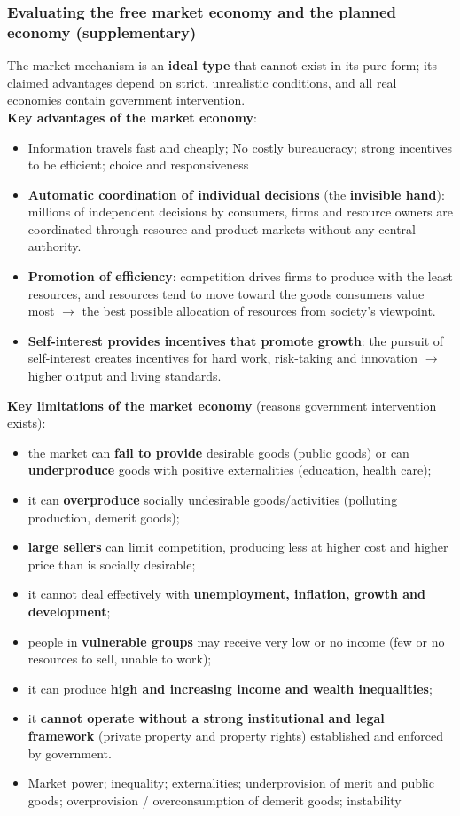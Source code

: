 \documentclass[a4paper,12pt]{article}
\newcommand{\needbold}[1]{\textcolor{red!70!black}{\textbf{#1}}}
\begin{document}
\subsubsection*{Evaluating the free market economy and the planned economy (supplementary)}
The market mechanism is an \needbold{ideal type} that cannot exist in its pure form; its claimed advantages depend on strict, unrealistic conditions, and all real economies contain government intervention.
\\
\textbf{Key advantages of the market economy}:
\begin{itemize}
	\item Information travels fast and cheaply; No costly bureaucracy; strong incentives to be efficient; choice and responsiveness
  \item \textbf{Automatic coordination of individual decisions} (the \textbf{invisible hand}): millions of independent decisions by consumers, firms and resource owners are coordinated through resource and product markets without any central authority.
  \item \textbf{Promotion of efficiency}: competition drives firms to produce with the least resources, and resources tend to move toward the goods consumers value most $\to$ the best possible allocation of resources from society's viewpoint.
  \item \textbf{Self-interest provides incentives that promote growth}: the pursuit of self-interest creates incentives for hard work, risk-taking and innovation $\to$ higher output and living standards.
\end{itemize}
\textbf{Key limitations of the market economy} (reasons government intervention exists):
\begin{itemize}
  \item the market can \textbf{fail to provide} desirable goods (public goods) or can \textbf{underproduce} goods with positive externalities (education, health care);
  \item it can \textbf{overproduce} socially undesirable goods/activities (polluting production, demerit goods);
  \item \textbf{large sellers} can limit competition, producing less at higher cost and higher price than is socially desirable;
  \item it cannot deal effectively with \textbf{unemployment, inflation, growth and development};
  \item people in \textbf{vulnerable groups} may receive very low or no income (few or no resources to sell, unable to work);
  \item it can produce \textbf{high and increasing income and wealth inequalities};
  \item it \textbf{cannot operate without a strong institutional and legal framework} (private property and property rights) established and enforced by government.
	\item Market power; inequality; externalities; underprovision of merit and public goods; overprovision / overconsumption of demerit goods; instability
\end{itemize}
\end{document}
